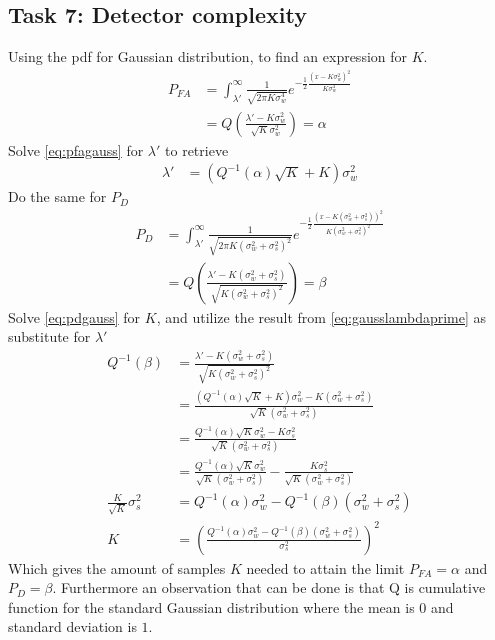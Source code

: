 \subsection{Task 7: Detector complexity}
Using the pdf for Gaussian distribution, to find an expression for $K$.
\begin{align}
    P_{FA} & = 
    \int_{\lambda'}^{\infty}\frac{1}{\sqrt{2\pi K\sigma_w^4}}e^{-\frac{1}{2}\frac{\left(x-K\sigma_w^2\right)^2}{K\sigma_w^4}}\nonumber\\
    & = Q\left(\frac{\lambda'-K\sigma_w^2}{\sqrt{K}\sigma_w^2}\right)
    = \alpha\label{eq:pfagauss}
\end{align}
Solve \eqref{eq:pfagauss} for $\lambda'$ to retrieve
\begin{align}
    \lambda' & = \left(Q^{-1}(\alpha)\sqrt{K}+K\right)\sigma_w^2\label{eq:gausslambdaprime}
    \end{align}
Do the same for $P_D$
\begin{align}
    P_{D} & = 
    \int_{\lambda'}^{\infty}\frac{1}{\sqrt{2\pi K(\sigma_w^2+\sigma_s^2)^2}}e^{-\frac{1}{2}\frac{(x-K(\sigma_w^2+\sigma_s^2))^2}{K(\sigma_w^2+\sigma_s^2)^2}}\nonumber\\
    & = Q\left(\frac{\lambda'-K(\sigma_w^2+\sigma_s^2)}{\sqrt{K(\sigma_w^2+\sigma_s^2)^2}}\right)
    = \beta\label{eq:pdgauss}
\end{align}
Solve \eqref{eq:pdgauss} for $K$, and utilize the result from \eqref{eq:gausslambdaprime} as substitute for $\lambda'$
\begin{align}
    Q^{-1}(\beta) & = \frac{\lambda'-K(\sigma_w^2+\sigma_s^2)}{\sqrt{K(\sigma_w^2+\sigma_s^2)^2}}\nonumber\\
    & = \frac{(Q^{-1}(\alpha)\sqrt{K}+K)\sigma_w^2-K(\sigma_w^2+\sigma_s^2)}{\sqrt{K}(\sigma_w^2+\sigma_s^2)}\nonumber\\
    & = \frac{Q^{-1}(\alpha)\sqrt{K}\sigma_w^2-K\sigma_s^2}{\sqrt{K}(\sigma_w^2+\sigma_s^2)}\nonumber\\
    & = \frac{Q^{-1}(\alpha)\sqrt{K}\sigma_w^2}{\sqrt{K}(\sigma_w^2+\sigma_s^2)}-\frac{K\sigma_s^2}{\sqrt{K}(\sigma_w^2+\sigma_s^2)}\nonumber\\
    \frac{K}{\sqrt{K}}\sigma_s^2 & = Q^{-1}(\alpha)\sigma_w^2-Q^{-1}(\beta)(\sigma_w^2+\sigma_s^2)\nonumber\\
    K & = \left( \frac{Q^{-1}(\alpha)\sigma_w^2-Q^{-1}(\beta)(\sigma_w^2+\sigma_s^2)}{\sigma_s^2}\right)^2
\end{align}
Which gives the amount of samples $K$ needed to attain the limit $P_{FA} = \alpha$ and $P_D = \beta$. Furthermore an observation that can be done is that Q is cumulative function for the standard Gaussian distribution where the mean is $0$ and standard deviation is $1$.

